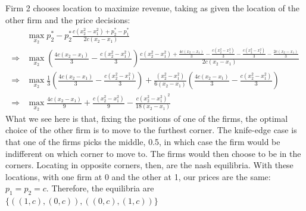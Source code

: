 \documentclass[11pt]{article} %
\begin{document}
Firm 2 chooses location to maximize revenue, taking as given the location of the other firm and the price decisions:
\begin{align*}
&\max_{x_2}  p_2^{*}-p_2^{*}\frac{c(x_2^2 - x_1^2) + p_2^{*} - p_1^{*}}{2c(x_2 - x_1)}\\
\Rightarrow&\max_{x_2}  \left(\frac{4c(x_2 - x_1)}{3} - \frac{c(x_2^2 - x_1^2)}{3}\right)\frac{c(x_2^2 - x_1^2) +  \frac{4c(x_2 - x_1)}{3} - \frac{c(x_2^2 - x_1^2)}{3} - \frac{c(x_2^2 - x_1^2)}{3} - \frac{2c(x_2 - x_1)}{3}}{2c(x_2 - x_1)}\\
\Rightarrow&\max_{x_2}  \frac{1}{3}\left(\frac{4c(x_2 - x_1)}{3} - \frac{c(x_2^2 - x_1^2)}{3}\right) + \frac{(x_2^2 - x_1^2)}{6(x_2 - x_1)}\left(\frac{4c(x_2 - x_1)}{3} - \frac{c(x_2^2 - x_1^2)}{3}\right)\\
\Rightarrow&\max_{x_2} \frac{4c(x_2 - x_1)}{9} + \frac{c(x_2^2 - x_1^2)}{9} - \frac{c(x_2^2 - x_1^2)^2}{18(x_2 - x_1)}%
\end{align*}
What we see here is that, fixing the positions of one of the firms, the optimal choice of the other firm is to move to the furthest corner. The knife-edge case is that one of the firms picks the middle, 0.5, in which case the firm would be indifferent on which corner to move to. The firms would then choose to be in the corners. Locating in opposite corners, then, are the nash equilibria. With these locations, with one firm at 0 and the other at 1, our prices are the same: $p_1 = p_2 = c$. Therefore, the equilibria are $\{((1,c),(0,c)),((0,c),(1,c))\}$
\end{document}
